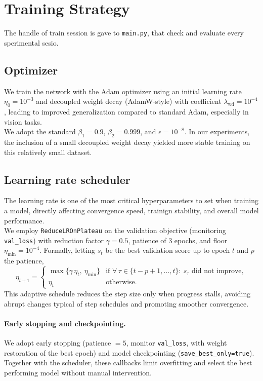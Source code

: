 \documentclass[target=bach,aauheader=,style=]{thud}
\begin{document}
\section{Training Strategy}
The handle of train session is gave to \texttt{main.py}, that check and evaluate every sperimental sesio. 
\label{sec:train-strategy}

\subsection{Optimizer}
We train the network with the Adam optimizer \cite{kingma2014adam} using an initial learning rate $\eta_0=10^{-3}$ and
decoupled weight decay (AdamW-style) with coefficient $\lambda_{\mathrm{wd}}=10^{-4}$ \cite{loshchilov2019adamw}, leading to improved generalization compared to standard Adam, especially in vision tasks.\\
We adopt the standard $\beta_1{=}0.9$, $\beta_2{=}0.999$, and $\epsilon{=}10^{-8}$. In our experiments, the inclusion of a small decoupled weight decay yielded more stable training on this relatively small dataset.

\subsection{Learning rate scheduler}
The learning rate is one of the most critical hyperparameters to set when training a model, directly affecting convergence speed, trainign stability, and overall model performance.\\
We employ \texttt{ReduceLROnPlateau} on the validation objective (monitoring \texttt{val\_loss}) with
reduction factor $\gamma{=}0.5$, patience of 3 epochs, and floor $\eta_{\min}{=}10^{-4}$.
Formally, letting $s_t$ be the best validation score up to epoch $t$ and $p$ the patience,
\[
\eta_{t+1} =
\begin{cases}
\max\{\gamma\,\eta_t,\ \eta_{\min}\} &\text{if } \forall\,\tau\in\{t-p+1,\ldots,t\}:\ s_\tau \text{ did not improve},\\[2pt]
\eta_t &\text{otherwise.}
\end{cases}
\]
This adaptive schedule reduces the step size only when progress stalls, avoiding abrupt changes typical of step schedules and promoting smoother convergence.

\paragraph{Early stopping and checkpointing.}
We adopt early stopping (patience $=5$, monitor \texttt{val\_loss}, with weight restoration of the best epoch) and model checkpointing (\texttt{save\_best\_only=true}). Together with the scheduler, these callbacks limit overfitting and select the best performing model without manual intervention.
\end{document}
